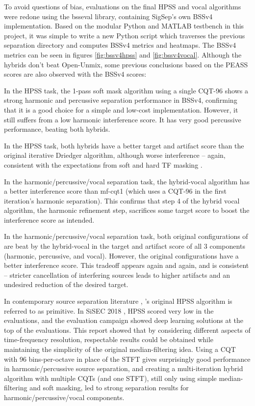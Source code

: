 \documentclass[letter,12pt]{article}
\newenvironment{tight_itemize}{
\begin{itemize}
  \setlength{\itemsep}{0pt}
  \setlength{\parskip}{0pt}
}{\end{itemize}}
\begin{document}
To avoid questions of bias, evaluations on the final HPSS and vocal algorithms were redone using the bsseval library, containing SigSep's own BSSv4 implementation. Based on the modular Python and MATLAB testbench in this project, it was simple to write a new Python script which traverses the previous separation directory and computes BSSv4 metrics and heatmaps. The BSSv4 metrics can be seen in figures \ref{fig:bssv4hpss} and \ref{fig:bssv4vocal}. Although the hybrids don't beat Open-Unmix, some previous conclusions based on the PEASS scores are also observed with the BSSv4 scores:

\begin{tight_itemize}
	\item
		In the HPSS task, the 1-pass soft mask algorithm using a single CQT-96 shows a strong harmonic and percussive separation performance in BSSv4, confirming that it is a good choice for a simple and low-cost implementation. However, it still suffers from a low harmonic interference score. It has very good percussive performance, beating both hybrids.
	\item
		In the HPSS task, both hybrids have a better target and artifact score than the original iterative Driedger algorithm, although worse interference -- again, consistent with the expectations from soft and hard TF masking \cite{masking}.
	\item
		In the harmonic/percussive/vocal separation task, the hybrid-vocal algorithm has a better interference score than mf-cqt1 (which uses a CQT-96 in the first iteration's harmonic separation). This confirms that step 4 of the hybrid vocal algorithm, the harmonic refinement step, sacrifices some target score to boost the interference score as intended.
	\item
		In the harmonic/percussive/vocal separation task, both original configurations of \citet{fitzgerald2} are beat by the hybrid-vocal in the target and artifact score of all 3 components (harmonic, percussive, and vocal). However, the original configurations have a better interference score. This tradeoff appears again and again, and is consistent -- stricter cancellation of interfering sources leads to higher artifacts and an undesired reduction of the desired target.
\end{tight_itemize}

In contemporary source separation literature \cite{nussl}, \citet{fitzgerald1}'s original HPSS algorithm is referred to as primitive. In SiSEC 2018 \cite{sigsep2018}, HPSS scored very low in the evaluations, and the evaluation campaign showed deep learning solutions at the top of the evaluations. This report showed that by considering different aspects of time-frequency resolution, respectable results could be obtained while maintaining the simplicity of the original median-filtering idea. Using a CQT with 96 bins-per-octave in place of the STFT gives surprisingly good performance in harmonic/percussive source separation, and creating a multi-iteration hybrid algorithm with multiple CQTs (and one STFT), still only using simple median-filtering and soft masking, led to strong separation results for harmonic/percussive/vocal components.
\end{document}
